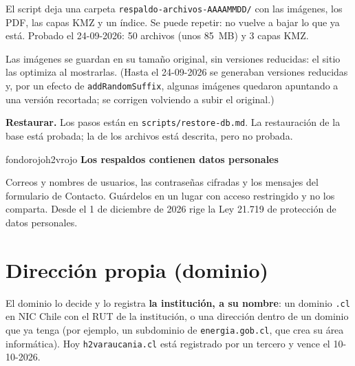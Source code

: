 \documentclass[11pt,letterpaper]{article}
\newcommand{\var}[1]{\nolinkurl{#1}}
\newcommand{\ruta}[1]{\nolinkurl{#1}}
\newcommand{\titulorecuadro}[2]{{\bfseries\color{#1}#2}\par\vspace{2pt}}
\begin{document}
El script deja una carpeta \var{respaldo-archivos-AAAAMMDD/} con las imágenes, los PDF, las capas KMZ y un índice. Se puede repetir: no vuelve a bajar lo que ya está. Probado el 24-09-2026: 50 archivos (unos 85~MB) y 3 capas KMZ.

Las imágenes se guardan en su tamaño original, sin versiones reducidas: el sitio las optimiza al mostrarlas. (Hasta el 24-09-2026 se generaban versiones reducidas y, por un efecto de \var{addRandomSuffix}, algunas imágenes quedaron apuntando a una versión recortada; se corrigen volviendo a subir el original.)

\textbf{Restaurar.} Los pasos están en \ruta{scripts/restore-db.md}. La restauración de la base está probada; la de los archivos está descrita, pero no probada.

\begin{recuadro}{fondorojo}{h2vrojo}
\titulorecuadro{h2vrojo}{Los respaldos contienen datos personales}
Correos y nombres de usuarios, las contraseñas cifradas y los mensajes del formulario de Contacto. Guárdelos en un lugar con acceso restringido y no los comparta. Desde el 1 de diciembre de 2026 rige la Ley 21.719 de protección de datos personales.
\end{recuadro}

\section{Dirección propia (dominio)}\label{sec:dominio}

El dominio lo decide y lo registra \textbf{la institución, a su nombre}: un dominio \var{.cl} en NIC Chile con el RUT de la institución, o una dirección dentro de un dominio que ya tenga (por ejemplo, un subdominio de \var{energia.gob.cl}, que crea su área informática). Hoy \var{h2varaucania.cl} está registrado por un tercero y vence el 10-10-2026.
\end{document}

